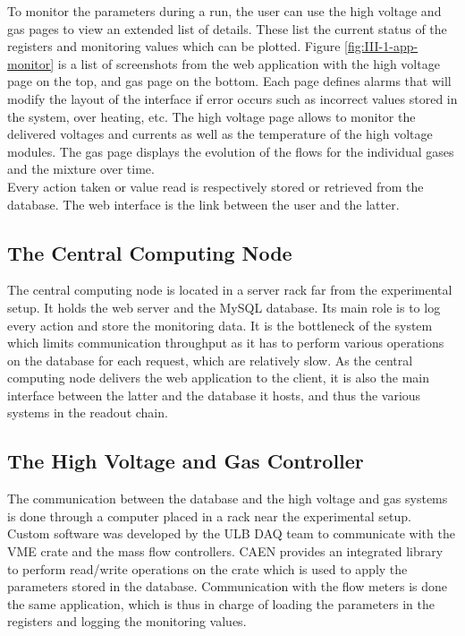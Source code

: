       To monitor the parameters during a run, the user can use the high voltage and gas pages to view an extended list of details. These list the current status of the registers and monitoring values which can be plotted. Figure \ref{fig:III-1-app-monitor} is a list of screenshots from the web application with the high voltage page on the top, and gas page on the bottom. Each page defines alarms that will modify the layout of the interface if error occurs such as incorrect values stored in the system, over heating, etc. The high voltage page allows to monitor the delivered voltages and currents as well as the temperature of the high voltage modules. The gas page displays the evolution of the flows for the individual gases and the mixture over time. \\

      Every action taken or value read is respectively stored or retrieved from the database. The web interface is the link between the user and the latter.

    \subsection{The Central Computing Node}

      The central computing node is located in a server rack far from the experimental setup. It holds the web server and the MySQL database. Its main role is to log every action and store the monitoring data. It is the bottleneck of the system which limits communication throughput as it has to perform various operations on the database for each request, which are relatively slow. As the central computing node delivers the web application to the client, it is also the main interface between the latter and the database it hosts, and thus the various systems in the readout chain.

    \subsection{The High Voltage and Gas Controller}

      The communication between the database and the high voltage and gas systems is done through a computer placed in a rack near the experimental setup. Custom software was developed by the ULB DAQ team to communicate with the VME crate and the mass flow controllers. CAEN provides an integrated library to perform read/write operations on the crate which is used to apply the parameters stored in the database. Communication with the flow meters is done the same application, which is thus in charge of loading the parameters in the registers and logging the monitoring values.

